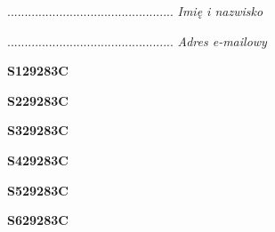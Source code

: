 \begin{turn}{90}\begin{minipage}{\linewidth} \vspace{20mm} ................................................  \textit{Imię i nazwisko}\end{minipage}\end{turn}

\begin{turn}{90}\begin{minipage}{\linewidth} \vspace{20mm} ................................................  \textit{Adres e-mailowy}\end{minipage}\end{turn}

\begin{turn}{90}\huge \begin{minipage}{\linewidth} \vspace{10mm}\textbf{S129283C}\end{minipage}\end{turn}

\begin{turn}{90}\huge \begin{minipage}{\linewidth} \vspace{10mm}\textbf{S229283C}\end{minipage}\end{turn}

\begin{turn}{90}\huge \begin{minipage}{\linewidth} \vspace{10mm}\textbf{S329283C}\end{minipage}\end{turn}

\begin{turn}{90}\huge \begin{minipage}{\linewidth} \vspace{10mm}\textbf{S429283C}\end{minipage}\end{turn}

\begin{turn}{90}\huge \begin{minipage}{\linewidth} \vspace{10mm}\textbf{S529283C}\end{minipage}\end{turn}

\begin{turn}{90}\huge \begin{minipage}{\linewidth} \vspace{10mm}\textbf{S629283C}\end{minipage}\end{turn}

